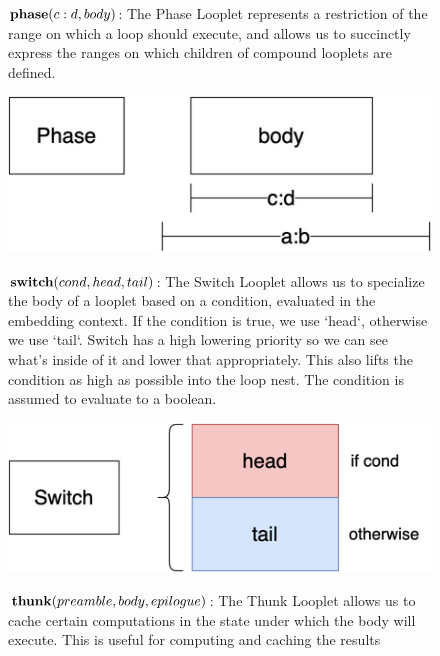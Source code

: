 \begin{figure}[ht]
    \begin{minipage}[c]{0.6\linewidth}
        $\text{\textbf{phase}}(c:d, body)$: The Phase Looplet represents a
        restriction of the range on which a loop should execute, and allows us
        to succinctly express the ranges on which children of compound looplets
        are defined.
    \end{minipage}%
    \begin{minipage}[c]{0.4\linewidth}
        \centering
        \includegraphics[scale=0.25]{Looplets-phase.png}
    \end{minipage}
    \begin{minipage}[c]{0.6\linewidth}
        $\text{\textbf{switch}}(cond, head, tail)$: The Switch Looplet allows
        us to specialize the body of a looplet based on a condition, evaluated
        in the embedding context. If the condition is true, we use `head`,
        otherwise we use `tail`. Switch has a high lowering priority so we can
        see what's inside of it and lower that appropriately. This also lifts
        the condition as high as possible into the loop nest. The condition is
        assumed to evaluate to a boolean.
    \end{minipage}%
    \begin{minipage}[c]{0.4\linewidth}
        \centering
        \includegraphics[scale=0.25]{Looplets-switch.png}
    \end{minipage}
    \begin{minipage}[c]{0.6\linewidth}
        $\text{\textbf{thunk}}(preamble, body, epilogue)$: The Thunk Looplet
        allows us to cache certain computations in the state under which the
        body will execute. This is useful for computing and caching the results

\end{minipage}
\end{figure}

